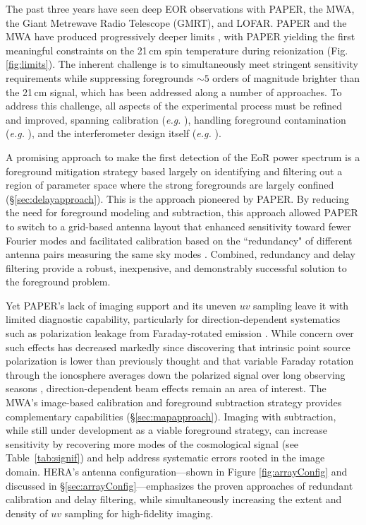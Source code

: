 \documentclass[preprint,11pt]{aastex}
\newcommand{\Mycitep}[1]{\citep{#1}}
\begin{document}
The past three years have seen deep EOR observations with PAPER, the MWA, 
the Giant Metrewave Radio Telescope (GMRT), and LOFAR.
PAPER and the MWA have produced progressively deeper limits
\citep{dillon_et_al2014,dillon_et_al2015,parsons_etal2014,ali_et_al2015}, with PAPER
yielding the first meaningful constraints on the 21\,cm spin temperature during reionization
(Fig. \ref{fig:limits}). %
The inherent challenge is to simultaneously meet stringent sensitivity requirements 
while suppressing foregrounds $\sim5$ orders of magnitude
brighter than the 21\,cm signal, which has been addressed along a number of approaches.  
To address this challenge,  all aspects of the experimental process must be refined and improved, spanning 
calibration ({\em e.g.} \cite{zheng_et_al2014, jacobs_et_al2016, 2016arXiv160300607B}), handling foreground contamination
({\em e.g.} \cite{moore_et_al2013,thyagarajan_et_al2015a,pober_et_al2016}),
and the interferometer design itself ({\em e.g.} \cite{parsons_et_al2012a,dillon_parsons2016}).

A promising approach to make the first detection of the EoR power spectrum 
is a foreground mitigation strategy based largely
on identifying and filtering out a region of parameter space where the strong foregrounds are largely confined (\S\ref{sec:delayapproach}).  This is the approach
pioneered by PAPER.
By reducing the need
for foreground modeling and subtraction, this approach allowed PAPER to switch to a grid-based antenna layout that
enhanced sensitivity toward fewer Fourier modes and facilitated calibration
based on the ``redundancy" of different antenna pairs measuring the same sky modes \citep{liu_et_al2010,zheng_et_al2014}.
Combined, redundancy and delay filtering provide a robust, inexpensive, and demonstrably successful solution 
to the foreground problem.

Yet PAPER's lack of imaging support and its uneven $uv$ sampling 
leave it with limited diagnostic capability, particularly for direction-dependent systematics
such as polarization leakage from Faraday-rotated emission \Mycitep{moore_et_al2013, nunhokee_etal_2016}.
While concern over such effects has decreased markedly since discovering that
intrinsic point source polarization is lower than previously thought
\citep{asad_et_al2015} and that variable Faraday rotation through the
ionosphere averages down the polarized signal over long observing seasons
\Mycitep{moore_et_al2016,aguirre_etal_2016}, direction-dependent beam effects remain an area of interest.
The MWA's image-based calibration and foreground subtraction strategy provides complementary
capabilities (\S\ref{sec:mapapproach}). Imaging with subtraction, while still under development as a viable foreground strategy,
can increase sensitivity by recovering more modes of the cosmological signal (see
Table~\ref{tab:signif}) and help address systematic errors rooted
in the image domain.  HERA's antenna configuration---shown in Figure \ref{fig:arrayConfig} and discussed in \S\ref{sec:arrayConfig}---emphasizes
the proven approaches of redundant calibration and delay filtering, while simultaneously
increasing the extent and density of $uv$ sampling for high-fidelity imaging.  
\end{document}
